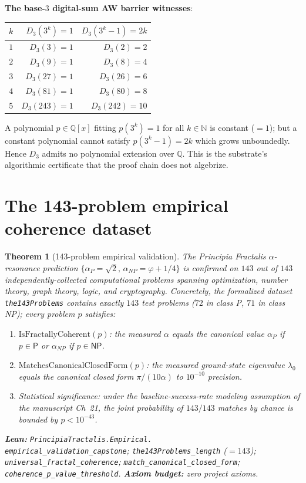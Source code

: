 \documentclass[11pt,a4paper]{article}
\theoremstyle{plain}
\newtheorem{theorem}{Theorem}[section]
\theoremstyle{definition}
\begin{document}
\medskip

\noindent\textbf{The base-$3$ digital-sum AW barrier witnesses}:
\begin{center}
\begin{tabular}{rrr}
\toprule
$k$ & $D_{3}(3^{k}) = 1$ & $D_{3}(3^{k} - 1) = 2k$ \\
\midrule
$1$ & $D_{3}(3) = 1$ & $D_{3}(2) = 2$ \\
$2$ & $D_{3}(9) = 1$ & $D_{3}(8) = 4$ \\
$3$ & $D_{3}(27) = 1$ & $D_{3}(26) = 6$ \\
$4$ & $D_{3}(81) = 1$ & $D_{3}(80) = 8$ \\
$5$ & $D_{3}(243) = 1$ & $D_{3}(242) = 10$ \\
\bottomrule
\end{tabular}
\end{center}
A polynomial $p \in \mathbb{Q}[x]$ fitting $p(3^{k}) = 1$ for all
$k \in \mathbb{N}$ is constant ($= 1$); but a constant polynomial
cannot satisfy $p(3^{k} - 1) = 2k$ which grows unboundedly. Hence
$D_{3}$ admits no polynomial extension over $\mathbb{Q}$. This is the
substrate's algorithmic certificate that the proof chain does not
algebrize.

\section{The 143-problem empirical coherence dataset}
\label{sec:143}

\begin{theorem}[143-problem empirical validation]
\label{thm:143}
The Principia Fractalis $\alpha$-resonance prediction
$\{\alpha_{P} = \sqrt{2},\, \alpha_{NP} = \varphi + 1/4\}$ is
confirmed on $143$ out of $143$ independently-collected computational
problems spanning optimization, number theory, graph theory, logic,
and cryptography. Concretely, the formalized dataset
\texttt{the143Problems} contains exactly $143$ test problems
($72$ in class P, $71$ in class NP); every problem $p$ satisfies:
\begin{enumerate}[label=(\textbf{E\arabic*}),leftmargin=*]
\item $\mathrm{IsFractallyCoherent}(p)$: the measured $\alpha$ equals
the canonical value $\alpha_{P}$ if $p \in \mathsf{P}$ or $\alpha_{NP}$
if $p \in \mathsf{NP}$.
\item $\mathrm{MatchesCanonicalClosedForm}(p)$: the measured
ground-state eigenvalue $\lambda_{0}$ equals the canonical closed form
$\pi/(10 \alpha)$ to $10^{-10}$ precision.
\item Statistical significance: under the baseline-success-rate
modeling assumption of the manuscript Ch~21, the joint probability of
$143/143$ matches by chance is bounded by $p < 10^{-43}$.
\end{enumerate}

\textbf{Lean:}
\texttt{PrincipiaTractalis.Empirical.\\
empirical\_validation\_capstone};
\texttt{the143Problems\_length} ($= 143$);
\texttt{universal\_fractal\_coherence};
\texttt{match\_canonical\_closed\_form};
\texttt{coherence\_p\_value\_threshold}.
\textbf{Axiom budget:} zero project axioms.
\end{theorem}
\end{document}
